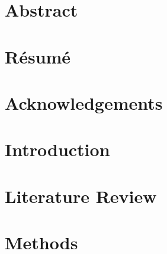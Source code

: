 \documentclass[a4paper, 12pt, oneside]{article}
\theoremstyle{alten}
\begin{document}
\color{altenNavy}



\clearpage
{}


\clearpage
\section*{Abstract}
\label{sec:abstract}


\clearpage
\section*{R\'esum\'e}
\label{sec:resume}


\clearpage
\section*{Acknowledgements}
\label{sec:acknowledgements}


\clearpage
\printnoidxglossaries{}

\clearpage
\tableofcontents

\clearpage
\listoffigures

\clearpage
\listoftables


\clearpage
{}
\section{Introduction}
\label{sec:Introduction}


\clearpage
\section{Literature Review}
\label{sec:Literature}


\clearpage
\section{Methods}
\label{sec:Methods}

\end{document}
